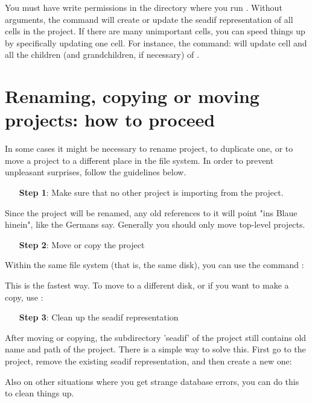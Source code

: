 You must have write permissions in the directory where you run
.  Without arguments, the command  will create or
update the seadif representation of all cells in the project. If there
are many unimportant cells, you can speed things up by specifically
updating one cell. For instance, the command:
will update cell  and all the children (and grandchildren, if
necessary) of . 


\section{Renaming, copying or moving projects: how to proceed}
\label{renamingprojects}
In some cases it might be necessary to rename project, to duplicate
one, or to move a project to a different place in the file system. In
order to prevent unpleasant surprises, follow the guidelines below.

\begin{itemize}
\item[{\bf Step 1}:]
Make sure that no other project is importing from the project.
\end{itemize}

Since the project will be renamed, any old references to it will point
"ins Blaue hinein", like the Germans say. Generally you should only move 
top-level projects. 

\begin{itemize}
\item[{\bf Step 2}:]
Move or copy the project
\end{itemize}
Within the same file system (that is, the same disk), you can use the
 command :\cd{}

This is the fastest way. To move to a different disk, or if you want
to make a copy, use :

\begin{itemize}
\item[{\bf Step 3}:]
Clean up the seadif representation
\end{itemize}

After moving or copying, the subdirectory 'seadif' of the project
still contains old name and path of the project. There is a simple 
way to solve this. First go to the project, remove the existing 
seadif representation, and then create a new one:\cd{}
 

Also on other situations where you get strange database errors, you 
can do this to clean things up.


